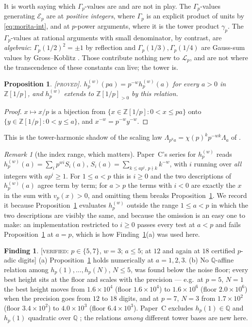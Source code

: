 \documentclass[11pt,reqno]{article}
\newcommand{\QQ}{\mathbb{Q}}
\newcommand{\ZZ}{\mathbb{Z}}
\newcommand{\Gp}{\Gamma_p}
\newcommand{\gtow}{\gamma_p}
\newcommand{\vp}{v_p}
\newcommand{\El}{\mathcal{E}_p}
\newcommand{\Lalg}{\mathcal{L}_p}
\newcommand{\PROVED}{{\normalfont\textsc{[proved]}}}
\newcommand{\VER}[1]{{\normalfont\textsc{[verified:} #1\textsc{]}}}
\theoremstyle{plain}
\newtheorem{proposition}[theorem]{Proposition}
\theoremstyle{definition}
\newtheorem{finding}[theorem]{Finding}
\theoremstyle{remark}
\newtheorem{remark}[theorem]{Remark}
\numberwithin{equation}{section}
\begin{document}
It is worth saying which $\Gp$-values are and are not in play.  The $\Gp$-values
generating $\El$ are at \emph{positive integers}, where $\Gp$ is an explicit
product of units by \eqref{eq:morita-int}, and at $p$-power arguments, where it
is the tower product $\gtow$.  The $\Gp$-values at rational arguments with small
denominator, by contrast, are \emph{algebraic}: $\Gp(1/2)^2=\pm1$ by reflection
and $\Gp(1/3),\Gp(1/4)$ are Gauss-sum values by Gross--Koblitz
\cite{GrossKoblitz1979}.  Those contribute nothing new to $\Lalg$, and are not
where the transcendence of these constants can live; the tower is.

\begin{proposition}\label{prop:hp}
\PROVED.  $h_p^{(w)}(pa)=p^{-w}h_p^{(w)}(a)$ for every $a>0$ in $\ZZ[1/p]$, and
$h_p^{(w)}$ extends to $\ZZ[1/p]_{>0}$ by this relation.
\end{proposition}
\begin{proof}
$x\mapsto x/p$ is a bijection from $\{x\in\ZZ[1/p]:0<x\le pa\}$ onto
$\{y\in\ZZ[1/p]:0<y\le a\}$, and $x^{-w}=p^{-w}y^{-w}$.
\end{proof}

This is the tower-harmonic shadow of the scaling law
$\Lambda_{p^ka}=\chi(p)^kp^{-wk}\Lambda_a$ of \cite[Prop.~2.5(iii)]{PaperC}.

\begin{remark}[the index range, which matters]\label{rem:index}
Paper~C's series for $h^{(w)}_p$ reads
$h^{(w)}_p(a)=\sum_ip^{wi}S_i(a)$, $S_i(a)=\sum_{k\le ap^i,\,p\nmid k}k^{-w}$,
with $i$ running over \emph{all} integers with $ap^i\ge1$.  For $1\le a<p$ this
is $i\ge0$ and the two descriptions of $h^{(w)}_p(a)$ agree term by term; for
$a>p$ the terms with $i<0$ are exactly the $x$ in the sum with $\vp(x)>0$, and
omitting them breaks Proposition~\ref{prop:hp}.  We record it because
Proposition~\ref{prop:hp} evaluates $h^{(w)}_p$ outside the range $1\le a<p$ in
which the two descriptions are visibly the same, and because the omission is an
easy one to make: an implementation restricted to $i\ge0$ passes every test at
$a<p$ and fails Proposition~\ref{prop:hp} at $a=p$, which is how
Finding~\ref{find:hp}(a) was used here.
\end{remark}

\begin{finding}\label{find:hp}
\VER{$p\in\{5,7\}$, $w=3$; $a\le5$; at $12$ and again at $18$ certified
$p$-adic digits}  (a) Proposition~\ref{prop:hp} holds numerically at $a=1,2,3$.
(b) No $\QQ$-affine relation among $h_p(1),\dots,h_p(N)$, $N\le5$, was found
below the noise floor; every best height sits at the floor and scales with the
precision --- e.g.\ at $p=5$, $N=1$ the best height moves from
$1.6\times10^{4}$ (floor $1.6\times10^{4}$) to $1.6\times10^{6}$ (floor
$2.0\times10^{6}$) when the precision goes from $12$ to $18$ digits, and at
$p=7$, $N=3$ from $1.7\times10^{2}$ (floor $3.4\times10^{2}$) to
$4.0\times10^{3}$ (floor $6.4\times10^{3}$).  Paper~C excludes $h_p(1)\in\QQ$
and $h_p(1)$ quadratic over $\QQ$ \cite[\S5.2]{PaperC}; the relations
\emph{among} different tower bases are new here.
\end{finding}
\end{document}
